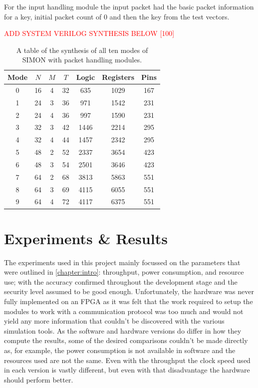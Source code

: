 \documentclass[12pt,twoside,a4paper]{report}
\begin{document}
	For the input handling module the input packet had the basic packet information for a key, initial packet count of $0$ and then the key from the test vectors.

	\textcolor{red}{ADD SYSTEM VERILOG SYNTHESIS BELOW [100]}
	
	\begin{table}[H]
	\centering
	\begin{tabular}{||c|c|c|c|c|c|c||}
		\hline \hline
		Mode  & $N$ & $M$ & $T$ & Logic & Registers & Pins\\
		\hline \hline
		0 & 16 & 4 & 32 & 635 & 1029 & 167 \\
		\hline
		1 & 24 & 3 & 36 & 971	& 1542 & 231  \\
		2 & 24 & 4 & 36 & 997 &	1590 & 231  \\
		\hline
		3 & 32 & 3 & 42 & 1446 & 2214 &	295  \\
		4 & 32 & 4 & 44 & 1457 & 2342 &	295	\\
		\hline
		5 & 48 & 2 & 52 & 2337 & 3654 &	423  \\
		6 & 48 & 3 & 54 & 2501 & 3646 & 423 \\
		\hline
		7 & 64 & 2 & 68 & 3813 & 5863 & 551  \\
		8 & 64 & 3 & 69 & 4115 & 6055 & 551 \\
 		9 & 64 & 4 & 72 & 4117 & 6375 &	551 \\
		\hline \hline
	\end{tabular}
	\caption{A table of the synthesis of all ten modes of SIMON with packet handling modules.}
	\label{table:synth3}
	\end{table}

	\chapter{Experiments \& Results}
	\label{chapter:RESULT}
	
	The experiments used in this project mainly focussed on the parameters that were outlined in \autoref{chapter:intro}: throughput, power consumption, and resource use; with the accuracy confirmed throughout the development stage and the security level assumed to be good enough. Unfortunately, the hardware was never fully implemented on an FPGA as it was felt that the work required to setup the modules to work with a communication protocol was too much and would not yield any more information that couldn't be discovered  with the various simulation tools. As the software and hardware versions do differ in how they compute the results, some of the desired comparisons couldn't be made directly as, for example, the power consumption is not available in software and the resources used are not the same. Even with the throughput the clock speed used in each version is vastly different, but even with that disadvantage the hardware should perform better.
	
\end{document}
